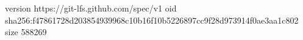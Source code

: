version https://git-lfs.github.com/spec/v1
oid sha256:f47861728d203854939968c10b16f10b5226897cc9f28d973914f0ae3aa1c802
size 588269
